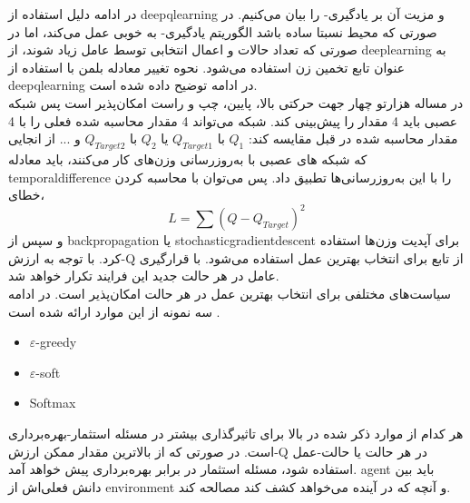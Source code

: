 در ادامه دلیل استفاده از \gls{deepqlearning} و مزیت آن بر یادگیری- را بیان می‌کنیم.
در صورتی که محیط نسبتا ساده باشد الگوریتم  یادگیری- به خوبی عمل می‌کند، اما در صورتی که تعداد حالات و اعمال انتخابی توسط عامل زیاد شوند، از \gls{deeplearning} به عنوان تابع تخمین زن استفاده می‌شود.
نحوه تغییر معادله بلمن با استفاده از \gls{deepqlearning} در ادامه توضیح داده شده است. 
\\
در مساله هزارتو چهار جهت حرکتی بالا، پایین، چپ و راست امکان‌پذیر است پس شبکه عصبی باید 4 مقدار را پیش‌بینی کند. شبکه می‌تواند 4 مقدار محاسبه شده فعلی را  با 4 مقدار محاسبه شده در قبل مقایسه کند:
$Q_1$ با $Q_{Target1}$ یا $Q_2$ با $Q_{Target2}$ و ...
از انجایی که شبکه های عصبی با به‌روزرسانی وزن‌های کار می‌کنند، باید معادله \gls{temporaldifference} را با این به‌روزرسانی‌ها تطبیق داد. پس می‌توان با محاسبه کردن خطای،
\begin{equation}
	L = \sum (Q - Q_{Target})^2
\end{equation}
و سپس از \gls{backpropagation} یا \gls{stochasticgradientdescent} برای آپدیت وزن‌ها استفاده کرد. با توجه به ارزش-Q از تابع  برای انتخاب بهترین عمل استفاده می‌شود. با قرارگیری عامل در هر حالت جدید این فرایند تکرار خواهد شد.
\\
سیاست‌های مختلفی برای انتخاب بهترین عمل در هر حالت امکان‌پذیر است. در ادامه سه نمونه از این موارد ارائه شده است
.
\begin{latin}
	\begin{itemize}
		\item $\varepsilon$-greedy
		\item $\varepsilon$-soft
		\item Softmax
	\end{itemize}
\end{latin}
هر کدام از موارد ذکر شده در بالا برای تاثیرگذاری بیشتر در مسئله استثمار-بهره‌برداری است. در صورتی که از بالاترین مقدار ممکن ارزش-Q در هر حالت یا  حالت-عمل استفاده شود، مسئله استثمار در برابر بهره‌برداری پیش خواهد آمد. \gls{agent} باید بین دانش فعلی‌اش از \gls{environment} و آنچه که در آینده می‌خواهد کشف کند مصالحه کند.


